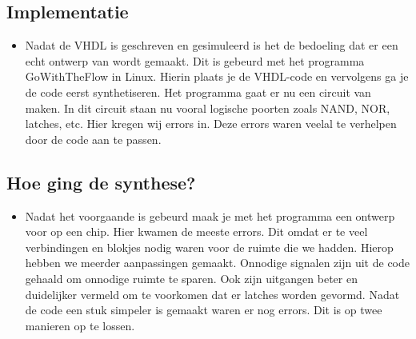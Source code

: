 





\subsection{Implementatie}
\begin{itemize}
\item Nadat de VHDL is geschreven en gesimuleerd is het de bedoeling dat er een echt ontwerp van wordt gemaakt. Dit is gebeurd met het programma GoWithTheFlow in Linux. Hierin plaats je de VHDL-code en vervolgens ga je de code eerst synthetiseren. Het programma gaat er nu een circuit van maken. In dit  circuit staan nu vooral logische poorten zoals NAND, NOR, latches, etc. Hier kregen wij errors in. Deze errors waren veelal te verhelpen door de code aan te passen.
\end{itemize}
\subsection{Hoe ging de synthese?}
\begin{itemize}
\item 
 Nadat het voorgaande is gebeurd maak je met het programma een ontwerp voor op een chip. Hier kwamen de meeste errors. Dit omdat er te veel verbindingen en blokjes nodig waren voor de ruimte die we hadden. Hierop hebben we meerder aanpassingen gemaakt. Onnodige signalen zijn uit de code gehaald om onnodige ruimte te sparen. Ook zijn uitgangen beter en duidelijker vermeld om te voorkomen dat er latches worden gevormd. Nadat de code een stuk simpeler is gemaakt waren er nog errors. Dit is op twee manieren op te lossen. 
\end{itemize}


